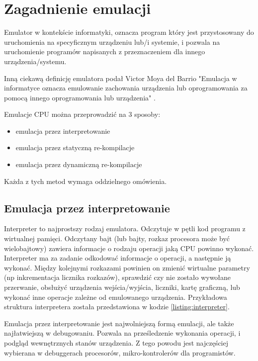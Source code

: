 \chapter{Zagadnienie emulacji}
	
	Emulator w kontekście informatyki, oznacza program który jest przystosowany do uruchomienia na specyficznym urządzeniu lub/i systemie, i pozwala na uruchomienie programów napisanych z przeznaczeniem dla innego urządzenia/systemu\cite{howDoIWriteAnEmulator}. 
	
	Inną ciekawą definicję emulatora podał Victor Moya del Barrio "Emulacja w informatyce oznacza emulowanie zachowania urządzenia lub oprogramowania za pomocą innego oprogramowania lub urządzenia"
	\cite{studyofthetechniquesforemulationprogramming}.
		
	Emulacje CPU można przeprowadzić na 3 sposoby:\cite{fms_komkon_org_howto}	
	\begin{itemize}  
		\item emulacja przez interpretowanie
		\item emulacja przez statyczną re-kompilacje
		\item emulacja przez dynamiczną re-kompilacje
	\end{itemize} 
	Każda z tych metod wymaga oddzielnego omówienia.
	
	\section{Emulacja przez interpretowanie}
	Interpreter to najprostszy rodzaj emulatora. Odczytuje w pętli kod programu z wirtualnej pamięci. Odczytany bajt (lub bajty, rozkaz procesora może być wielobajtowy) zawiera informacje o rodzaju operacji jaką CPU powinno wykonać. Interpreter ma za zadanie odkodować informacje o operacji, a następnie ją wykonać. Między kolejnymi rozkazami powinien on zmienić wirtualne parametry (np inkrementacja licznika rozkazów), sprawdzić czy nie zostało wywołane przerwanie, obsłużyć urządzenia wejścia/wyjścia, liczniki, kartę graficzną, lub wykonać inne operacje zależne od emulowanego urządzenia. Przykładowa struktura interpretera została przedstawiona w kodzie \ref{listing:interpreter}.
		
	
	
	Emulacja przez interpretowanie jest najwolniejszą formą emulacji, ale także najłatwiejszą w debugowaniu. Pozwala na prześledzenie wykonania operacji, i podgląd wewnętrznych stanów urządzenia. Z tego powodu jest najczęściej wybierana w debuggerach procesorów, mikro-kontrolerów dla programistów.
	
